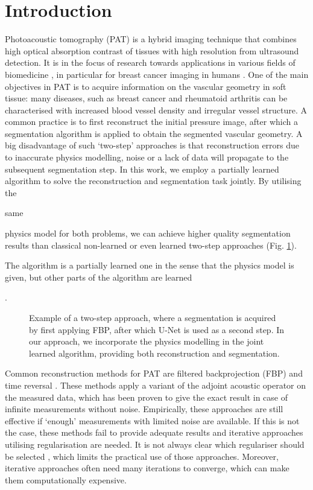 \documentclass[journal]{IEEEtran}
\newcommand{\hl}[1]{\cbcolor{red}\begin{changebar}{#1}\end{changebar}}
\begin{document}
\IEEEpeerreviewmaketitle
\vspace{-3mm}
\section{Introduction}
Photoacoustic tomography (PAT) is a hybrid imaging technique that combines high optical absorption contrast of tissues with high resolution from ultrasound detection. It is in the focus of research towards applications in various fields of biomedicine \cite{Zhou2016}, in particular for breast cancer imaging in humans \cite{Heijblom2015, Toi2017, Lin2018}. One of the main objectives in PAT is to acquire information on the vascular geometry in soft tissue: many diseases, such as breast cancer and rheumatoid arthritis can be characterised with increased blood vessel density and irregular vessel structure. A common practice is to first reconstruct the initial pressure image, after which a segmentation algorithm is applied to obtain the segmented vascular geometry. A big disadvantage of such `two-step' approaches is that reconstruction errors due to inaccurate physics modelling, noise or a lack of data will propagate to the subsequent segmentation step. In this work, we employ a partially learned algorithm to solve the reconstruction and segmentation task jointly. By utilising the \hl{same} physics model for both problems, we can achieve higher quality segmentation results than classical non-learned or even learned two-step approaches (Fig. \ref{fig:UNet_vs_LPD}). \hl{The algorithm is a partially learned one in the sense that the physics model is given, but other parts of the algorithm are learned}.

\begin{figure}[!ht]
\resizebox{\linewidth}{!}{%
\begin{tikzpicture}

\end{tikzpicture}}
\caption{Example of a two-step approach, where a segmentation is acquired by first applying FBP, after which U-Net is used as a second step. In our approach, we incorporate the physics modelling in the joint learned algorithm, providing both reconstruction and segmentation.}
\label{fig:UNet_vs_LPD}
\vspace{-3mm}
\end{figure}

Common reconstruction methods for PAT are filtered backprojection (FBP) \cite{Kruger1995, Finch2004, Willemink2010, Haltmeier2014} and time reversal \cite{Burgholzer2007, Treeby2010}. These methods apply a variant of the adjoint acoustic operator on the measured data, which has been proven to give the exact result in case of infinite measurements without noise. Empirically, these approaches are still effective if `enough' measurements with limited noise are available. If this is not the case, these methods fail to provide adequate results and iterative approaches utilising regularisation \cite{Dean-Ben2012a, Huang2013, Arridge2016a, Arridge2016b, Boink2018, Nguyen2018, Frikel2018} are needed. It is not always clear which regulariser should be selected \cite{Boink2018}, which limits the practical use of those approaches. Moreover, iterative approaches often need many iterations to converge, which can make them computationally expensive.
\end{document}
